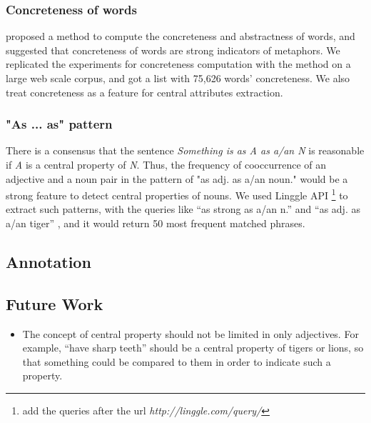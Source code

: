 \subsubsection{Concreteness of words}
 proposed a method to compute the concreteness and abstractness of words, and suggested that concreteness of words are strong indicators of metaphors. 
We replicated the experiments for concreteness computation with the method on a large web scale corpus, and got a list with 75,626 words' concreteness.
We also treat concreteness as a feature for central attributes extraction.

\subsubsection{"As ... as" pattern}
There is a consensus that the sentence {\sl Something is as A as a/an N} is reasonable if {\sl A} is a central property of {\sl N}.\cite{ano} 
Thus, the frequency of cooccurrence of an adjective and a noun pair in the pattern of "as adj. as a/an noun." would be a strong feature to detect central properties of nouns. 
We used Linggle API \cite{boisson2013linggle} \footnote{add the queries after the url {\sl http://linggle.com/query/}} to extract such patterns, with the queries like ``as strong as a/an n.''  and ``as adj. as a/an tiger'' , and it would return 50 most frequent matched phrases.



\subsection{Annotation}


\subsection{Future Work}
\begin{itemize}
\item The concept of central property should not be limited in only adjectives. For example, ``have sharp teeth'' should be a central property of tigers or lions, so that something could be compared to them in order to indicate such a property.
\end{itemize}